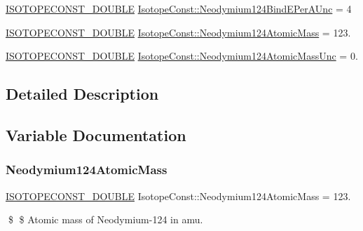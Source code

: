 \begin{DoxyCompactItemize}
\mbox{\hyperlink{group___isotope_const-_macros_ga8f45a7272ce02c0b4c65c44636ed719a}{I\+S\+O\+T\+O\+P\+E\+C\+O\+N\+S\+T\+\_\+\+D\+O\+U\+B\+LE}} \mbox{\hyperlink{group___isotope_const-_neodymium-_nd124_ga46e487405d0373af9f602391a3067218}{Isotope\+Const\+::\+Neodymium124\+Bind\+E\+Per\+A\+Unc}} = 4
\item 
\mbox{\hyperlink{group___isotope_const-_macros_ga8f45a7272ce02c0b4c65c44636ed719a}{I\+S\+O\+T\+O\+P\+E\+C\+O\+N\+S\+T\+\_\+\+D\+O\+U\+B\+LE}} \mbox{\hyperlink{group___isotope_const-_neodymium-_nd124_ga06883855033cb81fbc8b1b93f6eea6b9}{Isotope\+Const\+::\+Neodymium124\+Atomic\+Mass}} = 123.
\item 
\mbox{\hyperlink{group___isotope_const-_macros_ga8f45a7272ce02c0b4c65c44636ed719a}{I\+S\+O\+T\+O\+P\+E\+C\+O\+N\+S\+T\+\_\+\+D\+O\+U\+B\+LE}} \mbox{\hyperlink{group___isotope_const-_neodymium-_nd124_gaa7fc1479d2c6d1a8b592f6247a7f6463}{Isotope\+Const\+::\+Neodymium124\+Atomic\+Mass\+Unc}} = 0.
\end{DoxyCompactItemize}


\subsection{Detailed Description}


\subsection{Variable Documentation}
\mbox{\label{group___isotope_const-_neodymium-_nd124_ga06883855033cb81fbc8b1b93f6eea6b9}} 
\subsubsection{\texorpdfstring{Neodymium124\+Atomic\+Mass}{Neodymium124AtomicMass}}
{\footnotesize\ttfamily \mbox{\hyperlink{group___isotope_const-_macros_ga8f45a7272ce02c0b4c65c44636ed719a}{I\+S\+O\+T\+O\+P\+E\+C\+O\+N\+S\+T\+\_\+\+D\+O\+U\+B\+LE}} Isotope\+Const\+::\+Neodymium124\+Atomic\+Mass = 123.}

\$ \$ Atomic mass of Neodymium-\/124 in amu. \mbox{\label{group___isotope_const-_neodymium-_nd124_gaa7fc1479d2c6d1a8b592f6247a7f6463}} 
